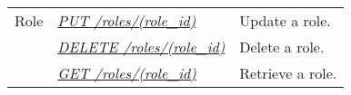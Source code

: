 \documentclass[letterpaper,10pt,english]{sphinxmanual}
\begin{document}
\noindent\begin{tabulary}{\linewidth}{|L|L|L|}
\hline
{}\relax &\relax &\relax \\
\hline
Role
&
{\hyperref[\detokenize{resources/role:put--roles-(role_id)}]{\emph{PUT /roles/(role\_id)}}}
&
Update a role.
\\
\hline&
{\hyperref[\detokenize{resources/role:delete--roles-(role_id)}]{\emph{DELETE /roles/(role\_id)}}}
&
Delete a role.
\\
\hline&
{\hyperref[\detokenize{resources/role:get--roles-(role_id)}]{\emph{GET /roles/(role\_id)}}}
&
Retrieve a role.
\\
\hline\end{tabulary}


\begin{DUlineblock}{0em}
\item[] 
\end{DUlineblock}
\end{document}
